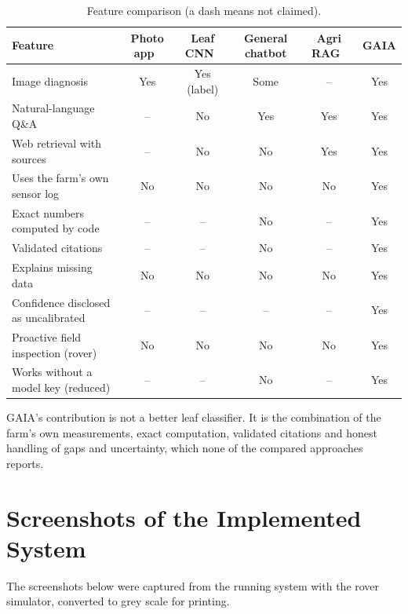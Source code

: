 \begin{table}[H]
\centering
\caption{Feature comparison (a dash means not claimed).}
\label{tab:compare}
\small
\setlength{\tabcolsep}{3pt}\footnotesize
\begin{tabular}{|P{3.0cm}|c|c|c|c|c|}
\hline
\textbf{Feature} & \textbf{Photo app~\cite{plantix}} & \textbf{Leaf CNN~\cite{mohanty2016plantvillage}} & \textbf{General chatbot} & \textbf{Agri RAG~\cite{yang2024shizishangpt}} & \textbf{GAIA}\\\hline
Image diagnosis & Yes & Yes (label) & Some & -- & Yes\\\hline
Natural-language Q\&A & -- & No & Yes & Yes & Yes\\\hline
Web retrieval with sources & -- & No & No & Yes & Yes\\\hline
Uses the farm's own sensor log & No & No & No & No & Yes\\\hline
Exact numbers computed by code & -- & -- & No & -- & Yes\\\hline
Validated citations & -- & -- & No & -- & Yes\\\hline
Explains missing data & No & No & No & No & Yes\\\hline
Confidence disclosed as uncalibrated & -- & -- & -- & -- & Yes\\\hline
Proactive field inspection (rover) & No & No & No & No & Yes\\\hline
Works without a model key (reduced) & -- & -- & No & -- & Yes\\\hline
\end{tabular}
\end{table}

GAIA's contribution is not a better leaf classifier. It is the combination of the farm's own measurements, exact computation, validated
citations and honest handling of gaps and uncertainty, which none of the compared approaches reports.

\section{Screenshots of the Implemented System}

The screenshots below were captured from the running system with the rover simulator, converted to grey scale for printing.

